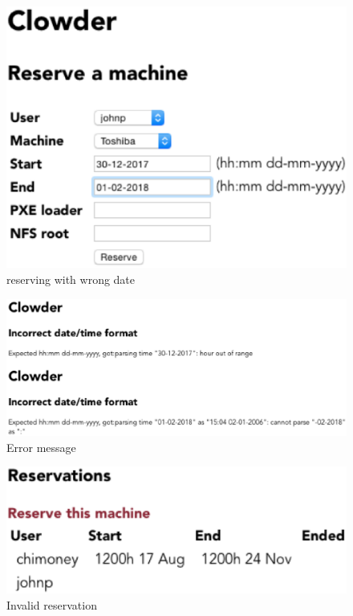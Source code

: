 \begin{figure}
\includegraphics[width=\linewidth]{dateformat1.eps}
\caption{reserving with wrong date}
\end{figure}

\begin{figure}
\includegraphics[width=\linewidth]{dateformat2.eps}
\caption{Error message}
\end{figure}

\begin{figure}
\includegraphics[width=\linewidth]{dateformat3.eps}
\caption{Invalid reservation}
\end{figure}
\pagebreak

